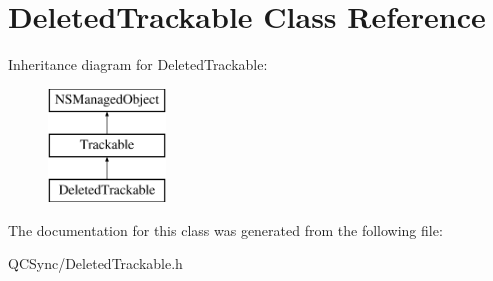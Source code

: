 \hypertarget{interface_deleted_trackable}{
\section{DeletedTrackable Class Reference}
\label{interface_deleted_trackable}
}
Inheritance diagram for DeletedTrackable:\begin{figure}[H]
\begin{center}
\leavevmode
\includegraphics[height=3.000000cm]{interface_deleted_trackable}
\end{center}
\end{figure}


The documentation for this class was generated from the following file:\begin{DoxyCompactItemize}
\item 
QCSync/DeletedTrackable.h\end{DoxyCompactItemize}
